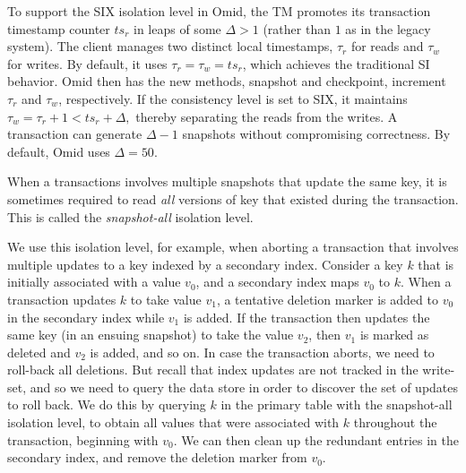 To support the SIX isolation level in Omid, the TM promotes its transaction timestamp counter $ts_r$ 
in leaps of some $\Delta > 1$ (rather than $1$ as in the legacy system).  The client manages 
two distinct local timestamps, $\tau_r$ for reads and $\tau_w$ for writes. By default, 
it uses  $\tau_r = \tau_w = ts_r$, which achieves the traditional SI behavior. Omid 
then has the new methods, snapshot and checkpoint, increment 
$\tau_r$ and $\tau_w$, respectively. If the consistency level is set to SIX, 
it maintains 
$\tau_w = \tau_r+1 < ts_r+\Delta,$
thereby separating the reads from the writes. 
A transaction can generate $\Delta-1$ snapshots without compromising
 correctness. By default, Omid uses $\Delta=50$.  

When a transactions involves multiple snapshots that update the same key, 
it is sometimes required to read \emph{all} versions of key that existed 
during the transaction. This is called the \emph{snapshot-all} isolation level.

We use this isolation level, for example, when aborting a transaction that 
involves multiple updates to a key indexed by a secondary index. 
Consider a key $k$ that is initially associated with a value $v_0$, 
and a secondary index maps $v_0$ to $k$. 
When a transaction updates $k$ to take value $v_1$, a tentative deletion marker
is added to $v_0$ in the secondary index while $v_1$ is added. 
If the transaction then updates 
the same key (in an ensuing snapshot) to take the value $v_2$, 
then $v_1$ is marked as deleted and $v_2$ is added, and so on. 
In case the transaction aborts, we need to roll-back all deletions. 
But recall that index updates are not tracked in the write-set,
and so we need to query the data store in order to discover the set
of updates to roll back. We do this by querying $k$ in the primary table
with the snapshot-all isolation level, to obtain all values 
that were associated with $k$ throughout the transaction, beginning with $v_0$.
We can then clean up the redundant entries in the secondary index, and 
remove the deletion marker from $v_0$.
 
